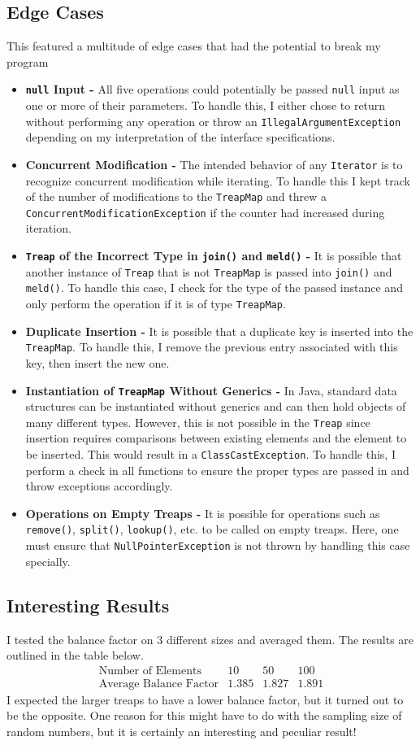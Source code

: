 \documentclass[11pt]{article}
\def\tt{\texttt}
\def\IAE{\tt{IllegalArgumentException}}
\def\NPE{\tt{NullPointerException}}
\def\TM{\tt{TreapMap}}
\def\CME{\tt{ConcurrentModificationException}}
\def\Treap{\tt{Treap}}
\def\lu{\tt{lookup()}}
\def\rem{\tt{remove()}}
\def\split{\tt{split()}}
\def\join{\tt{join()}}
\def\meld{\tt{meld()}}
\begin{document}
\subsection{Edge Cases}
This featured a multitude of edge cases that had the potential to break my program
\begin{itemize}
	\item \textbf{\tt{null} Input - } All five operations could potentially be passed \tt{null} input as one or more of their parameters. To handle this, I either chose to return without performing any operation or throw an \IAE{} depending on my interpretation of the interface specifications. 
	\item \textbf{Concurrent Modification - } The intended behavior of any \tt{Iterator} is to recognize concurrent modification while iterating. To handle this I kept track of the number of modifications to the \TM{} and threw a \CME{} if the counter had increased during iteration.
	\item \textbf{\Treap{} of the Incorrect Type in \join{} and \meld{} - } It is possible that another instance of \Treap{} that is not \TM{} is passed into \join{} and \meld{}. To handle this case, I check for the type of the passed instance and only perform the operation if it is of type \TM{}. 
	\item \textbf{Duplicate Insertion - } It is possible that a duplicate key is inserted into the \TM{}. To handle this, I remove the previous entry associated with this key, then insert the new one. 
	\item \textbf{Instantiation of \TM{} Without Generics - } In Java, standard data structures can be instantiated without generics and can then hold objects of many different types. However, this is not possible in the \Treap{} since insertion requires comparisons between existing elements and the element to be inserted. This would result in a \tt{ClassCastException}. To handle this, I perform a check in all functions to ensure the proper types are passed in and throw exceptions accordingly.
	\item \textbf{Operations on Empty Treaps - } It is possible for operations such as \rem{}, \split{}, \lu{}, etc. to be called on empty treaps. Here, one must ensure that \NPE{} is not thrown by handling this case specially.
\end{itemize}

\subsection{Interesting Results}
I tested the balance factor on $3$ different sizes and averaged them. The results are outlined in the table below. 
\[
\begin{array}{|c|c|c|c|}
 	\text{Number of Elements} & 10 & 50 & 100\\ 
 	\hline
 	\text{Average Balance Factor} & 1.385 & 1.827 & 1.891
\end{array}
\]
I expected the larger treaps to have a lower balance factor, but it turned out to be the opposite. One reason for this might have to do with the sampling size of random numbers, but it is certainly an interesting and peculiar result!
\end{document}
